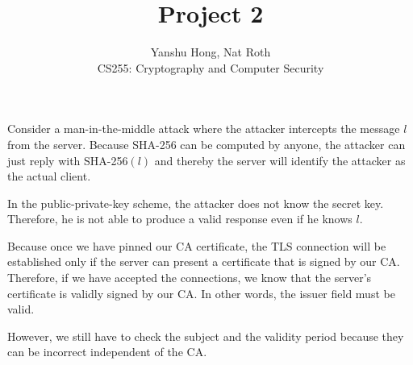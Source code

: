 \documentclass[12pt]{article}
\newenvironment{question}[2][Question]{\begin{trivlist}
\item[\hskip \labelsep {\bfseries #1}\hskip \labelsep {\bfseries #2.}]}{\end{trivlist}}
\begin{document}
\title{Project 2}
\author{Yanshu Hong, Nat Roth\\ 
CS255: Cryptography and Computer Security} 

\maketitle 
 

\begin{question}{1}
Consider a man-in-the-middle attack where the attacker intercepts the message $l$ from the server. Because SHA-256 can be computed by anyone, the attacker can just reply with SHA-256$(l)$ and thereby the server will identify the attacker as the actual client. 

In the public-private-key scheme, the attacker does not know the secret key. Therefore, he is not able to produce a valid response even if he knows $l$.
\end{question}


\begin{question}{2}
Because once we have pinned our CA certificate, the TLS connection will be established only if the server can present a certificate that is signed by our CA. Therefore, if we have accepted the connections, we know that the server's certificate is validly signed by our CA. In other words, the issuer field must be valid.

However, we still have to check the subject and the validity period because they can be incorrect independent of the CA.
\end{question}
\end{document}
